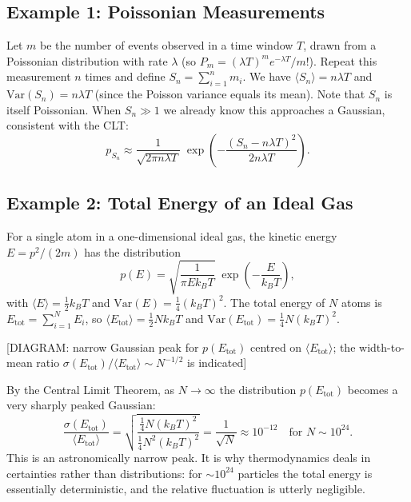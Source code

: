 \subsection{Example 1: Poissonian Measurements}

Let $m$ be the number of events observed in a time window $T$, drawn from a Poissonian distribution with rate $\lambda$ (so $P_m = (\lambda T)^m e^{-\lambda T}/m!$). Repeat this measurement $n$ times and define $S_n = \sum_{i=1}^{n} m_i$. We have $\langle S_n\rangle = n\lambda T$ and $\mathrm{Var}(S_n) = n\lambda T$ (since the Poisson variance equals its mean). Note that $S_n$ is itself Poissonian. When $S_n \gg 1$ we already know this approaches a Gaussian, consistent with the CLT:
\begin{equation}
    p_{S_n} \approx \frac{1}{\sqrt{2\pi n\lambda T}}\;\exp\!\left(-\frac{(S_n - n\lambda T)^2}{2n\lambda T}\right).
\end{equation}

\subsection{Example 2: Total Energy of an Ideal Gas}

For a single atom in a one-dimensional ideal gas, the kinetic energy $E = p^2/(2m)$ has the distribution
\begin{equation}
    p(E) = \sqrt{\frac{1}{\pi E k_B T}}\;\exp\!\left(-\frac{E}{k_B T}\right),
\end{equation}
with $\langle E\rangle = \tfrac{1}{2}k_B T$ and $\mathrm{Var}(E) = \tfrac{1}{4}(k_B T)^2$. The total energy of $N$ atoms is $E_{\text{tot}} = \sum_{i=1}^{N} E_i$, so $\langle E_{\text{tot}}\rangle = \tfrac{1}{2}Nk_B T$ and $\mathrm{Var}(E_{\text{tot}}) = \tfrac{1}{4}N(k_B T)^2$.

\begin{center}[DIAGRAM: narrow Gaussian peak for $p(E_{\text{tot}})$ centred on $\langle E_{\text{tot}}\rangle$; the width-to-mean ratio $\sigma(E_{\text{tot}})/\langle E_{\text{tot}}\rangle \sim N^{-1/2}$ is indicated]\end{center}

By the Central Limit Theorem, as $N\to\infty$ the distribution $p(E_{\text{tot}})$ becomes a very sharply peaked Gaussian:
\begin{equation}
    \frac{\sigma(E_{\text{tot}})}{\langle E_{\text{tot}}\rangle} = \sqrt{\frac{\tfrac{1}{4}N(k_BT)^2}{\tfrac{1}{4}N^2(k_BT)^2}} = \frac{1}{\sqrt{N}} \approx 10^{-12} \quad \text{for } N \sim 10^{24}.
\end{equation}
This is an astronomically narrow peak. It is why thermodynamics deals in certainties rather than distributions: for $\sim 10^{24}$ particles the total energy is essentially deterministic, and the relative fluctuation is utterly negligible.

